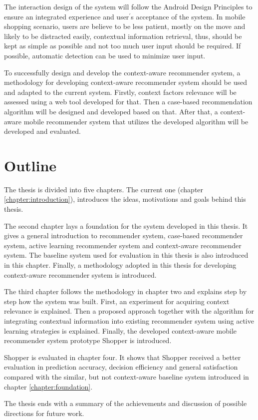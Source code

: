 The interaction design of the system will follow the Android Design Principles \cite{ref:43} to ensure an integrated experience and user$^\prime$s acceptance of the system. In mobile shopping scenario, users are believe to be less patient, mostly on the move and likely to be distracted easily, contextual information retrieval, thus, should be kept as simple as possible and not too much user input should be required. If possible, automatic detection can be used to minimize user input.

To successfully design and develop the context-aware recommender system, a methodology for developing context-aware recommender system \cite{ref:5} should be used and adapted to the current system. Firstly, context factors relevance will be assessed using a web tool developed for that. Then a case-based recommendation algorithm will be designed and developed based on that. After that, a context-aware mobile recommender system that utilizes the developed algorithm will be developed and evaluated.

\section{Outline} \label{sec:ol}

The thesis is divided into five chapters. The current one (chapter \ref{chapter:introduction}), introduces the ideas, motivations and goals behind this thesis.

The second chapter lays a foundation for the system developed in this thesis. It gives a general introduction to recommender system, case-based recommender system, active learning recommender system and context-aware recommender system. The baseline system used for evaluation in this thesis is also introduced in this chapter. Finally, a methodology adopted in this thesis for developing context-aware recommender system is introduced.

The third chapter follows the methodology in chapter two and explains step by step how the system was built. First, an experiment for acquiring context relevance is explained. Then a proposed approach together with the algorithm for integrating contextual information into existing recommender system using active learning strategies is explained. Finally, the developed context-aware mobile recommender system prototype Shopper is introduced. 

Shopper is evaluated in chapter four. It shows that Shopper received a better evaluation in prediction accuracy, decision efficiency and general satisfaction compared with the similar, but not context-aware baseline system introduced in chapter \ref{chapter:foundation}.

The thesis ends with a summary of the achievements and discussion of possible directions for future work.

